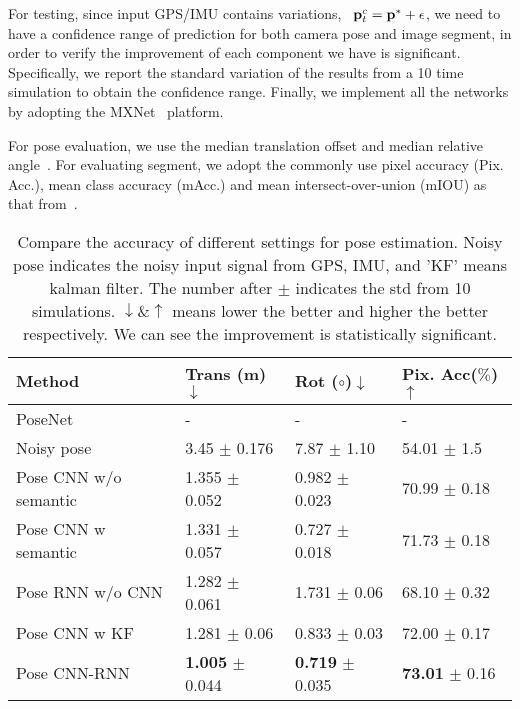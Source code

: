 For testing, since input GPS/IMU contains variations, \ie~${\mathbf p}_t^c={\mathbf p}^*+\epsilon$, we need to have a confidence range of prediction for both camera pose and image segment, in order to verify the improvement of each component we have is significant. Specifically, we report the standard variation of the results from a 10 time simulation to obtain the confidence range. Finally, we implement all the networks by adopting the MXNet~\cite{ChenLLLWWXXZZ15} platform.

For pose evaluation, we use the median translation offset and median relative angle~\cite{Kendall_2015_ICCV}. For evaluating segment, we adopt the commonly use pixel accuracy (Pix. Acc.), mean class accuracy (mAcc.) and mean intersect-over-union (mIOU) as that from~\cite{WuSH16e}.

\begin{table}
\vspace{-0\baselineskip}
\center
\fontsize{7}{8}\selectfont
\hspace*{-0.33cm}
\begin{tabular}{llll}
\toprule[0.1 em]
Method & Trans (m) $\downarrow$ & Rot ($\circ$)$\downarrow$  & Pix. Acc($\%$)$\uparrow$ \\
\hline
PoseNet~\cite{kendall2017geometric} & -  & -  & -  \\
Noisy pose & 3.45 $\pm$ 0.176 & 7.87 $\pm$ 1.10 & 54.01 $\pm$ 1.5 \\
Pose CNN w/o semantic & 1.355 $\pm$ 0.052  & 0.982 $\pm$ 0.023 & 70.99 $\pm$ 0.18 \\
Pose CNN w semantic & 1.331 $\pm$ 0.057  & 0.727 $\pm$ 0.018 & 71.73 $\pm$ 0.18  \\
Pose RNN w/o CNN & 1.282 $\pm$ 0.061  & 1.731 $\pm$ 0.06 &  68.10 $\pm$ 0.32 \\
Pose CNN w KF & 1.281 $\pm$ 0.06  & 0.833 $\pm$ 0.03 & 72.00 $\pm$ 0.17  \\
Pose CNN-RNN  & \textbf{1.005} $\pm$ 0.044  & \textbf{0.719} $\pm$ 0.035  & \textbf{73.01} $\pm$ 0.16  \\
\toprule[0.1 em]
\end{tabular}
\caption{Compare the accuracy of different settings for pose estimation.
Noisy pose indicates the noisy input signal from GPS, IMU, and 'KF' means kalman filter.
The number after $\pm$ indicates the std from 10 simulations. $\downarrow \& \uparrow$ means lower the better and higher the better respectively. 
We can see the improvement is statistically significant.}
\label{tbl:pose}
\vspace{-1.5\baselineskip}
\end{table}

